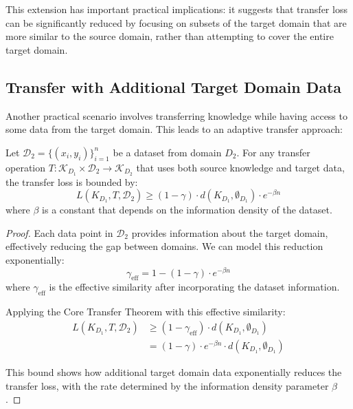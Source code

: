 This extension has important practical implications: it suggests that transfer loss can be significantly reduced by focusing on subsets of the target domain that are more similar to the source domain, rather than attempting to cover the entire target domain.

\subsection{Transfer with Additional Target Domain Data}

Another practical scenario involves transferring knowledge while having access to some data from the target domain. This leads to an adaptive transfer approach:

\begin{theorem}
Let $\mathcal{D}_2 = \{(x_i, y_i)\}_{i=1}^n$ be a dataset from domain $D_2$. For any transfer operation $T: \mathcal{K}_{D_1} \times \mathcal{D}_2 \to \mathcal{K}_{D_2}$ that uses both source knowledge and target data, the transfer loss is bounded by:
\begin{equation}
L(K_{D_1}, T, \mathcal{D}_2) \geq (1 - \gamma) \cdot d(K_{D_1}, \emptyset_{D_1}) \cdot e^{-\beta n}
\end{equation}
where $\beta$ is a constant that depends on the information density of the dataset.
\end{theorem}

\begin{proof}
Each data point in $\mathcal{D}_2$ provides information about the target domain, effectively reducing the gap between domains. We can model this reduction exponentially:
\begin{equation}
\gamma_{\text{eff}} = 1 - (1 - \gamma) \cdot e^{-\beta n}
\end{equation}
where $\gamma_{\text{eff}}$ is the effective similarity after incorporating the dataset information.

Applying the Core Transfer Theorem with this effective similarity:
\begin{align}
L(K_{D_1}, T, \mathcal{D}_2) &\geq (1 - \gamma_{\text{eff}}) \cdot d(K_{D_1}, \emptyset_{D_1}) \\
&= (1 - \gamma) \cdot e^{-\beta n} \cdot d(K_{D_1}, \emptyset_{D_1})
\end{align}

This bound shows how additional target domain data exponentially reduces the transfer loss, with the rate determined by the information density parameter $\beta$.
\end{proof}

